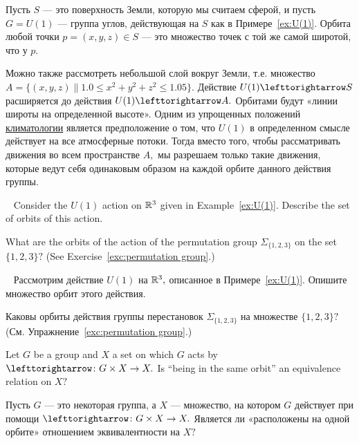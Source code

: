 \documentclass[../main/CT4S-EN-RU]{subfiles}
\begin{document}
\begin{applicationRUS}
Пусть $S$ — это поверхность Земли, которую мы считаем сферой, и пусть $G=U(1)$ — группа углов, действующая на $S$ как в Примере~\ref{ex:U(1)}. Орбита любой точки $p=(x,y,z)\in S$ — это множество точек с той же самой широтой, что у $p.$

Можно также рассмотреть небольшой слой вокруг Земли, т.е. множество $A=\{(x,y,z)\|1.0\leq x^2+y^2+z^2\leq 1.05\}.$ Действие $U(1)\acts S$ расширяется до действия $U(1)\acts A.$ Орбитами будут «линии широты на определенной высоте». Одним из упрощенных положений \href{https://ru.wikipedia.org/wiki/%D0%9A%D0%BB%D0%B8%D0%BC%D0%B0%D1%82%D0%BE%D0%BB%D0%BE%D0%B3%D0%B8%D1%8F}{\text климатологии} является предположение о том, что $U(1)$ в определенном смысле действует на все атмосферные потоки. Тогда вместо того, чтобы рассматривать движения во всем пространстве $A,$ мы разрешаем только такие движения, которые ведут себя одинаковым образом на каждой орбите данного действия группы.
\end{applicationRUS}

\begin{exerciseENG}~
\sexc Consider the $U(1)$ action on ${\mathbb R}^3$ given in Example~\ref{ex:U(1)}. Describe the set of orbits of this action.
\item What are the orbits of the action of the permutation group $\Sigma_{\{1,2,3\}}$ on the set $\{1,2,3\}?$ (See Exercise~\ref{exc:permutation group}.)
\endsexc
\end{exerciseENG}

\begin{exerciseRUS}~
\sexc Рассмотрим действие $U(1)$ на ${\mathbb R}^3,$ описанное в Примере~\ref{ex:U(1)}. Опишите множество орбит этого действия.
\item Каковы орбиты действия группы перестановок $\Sigma_{\{1,2,3\}}$ на множестве $\{1,2,3\}?$ (См. Упражнение~\ref{exc:permutation group}.)
\endsexc
\end{exerciseRUS}

\begin{exerciseENG}
Let $G$ be a group and $X$ a set on which $G$ acts by $\acts\taking G\times X\to X.$ Is “being in the same orbit” an equivalence relation on $X?$ 
\end{exerciseENG}

\begin{exerciseRUS}
Пусть $G$ — это некоторая группа, а $X$ — множество, на котором $G$ действует при помощи $\acts\taking G\times X\to X.$ Является ли «расположены на одной орбите» отношением эквивалентности на $X?$ 
\end{exerciseRUS}
\end{document}
